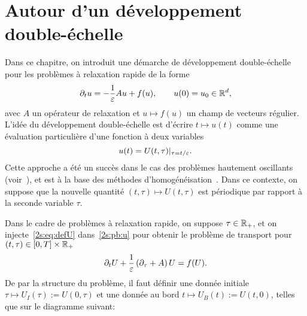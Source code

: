\chapter{Autour d'un développement double-échelle}
\label{chap:two-scale}

Dans ce chapitre, on introduit une démarche de développement double-échelle pour les problèmes à relaxation rapide de la forme
\begin{equation} \label{2s:pb:u}
    \partial_t u = -\frac{1}{\varepsilon}Au + f(u), 
    \qquad
    u(0) = u_0 \in \mathbb{R}^d , 
\end{equation}
avec $A$ un opérateur de relaxation et $u \mapsto f(u)$ un champ de vecteurs régulier. L'idée du développement double-échelle est d'écrire $t \mapsto u(t)$ comme une évaluation particulière d'une fonction à deux variables 
\begin{equation} \label{2s:eq:defU}
    u(t) = U(t,\tau)|_{\tau = t/\varepsilon} .
\end{equation}
Cette approche a été un succès dans le cas des problèmes hautement oscillants (voir~\cite{chartier.2015.uniformly, chartier.2020.derivative}), et est à la base des méthodes d'homogénéisation~\cite{allaire.1992.homogenization}. Dans ce contexte, on suppose que la nouvelle quantité $(t,\tau) \mapsto U(t,\tau)$ est périodique par rapport à la seconde variable $\tau$. 

Dans le cadre de problèmes à relaxation rapide, on suppose $\tau \in \mathbb{R}_+$, et on injecte~\eqref{2s:eq:defU} dans~\eqref{2s:pb:u} pour obtenir le problème de transport pour $(t,\tau) \in [0,T] \times \mathbb{R}_+$ 
\begin{equation} \label{2s:pb:trsp_U}
    \partial_t U + \frac{1}{\varepsilon} \left(\partial_\tau + A \right) U
    = f(U) .
\end{equation}
De par la structure du problème, il faut définir une donnée initiale $\tau \mapsto U_I(\tau) := U(0,\tau)$ et une donnée au bord $t \mapsto U_B(t) := U(t,0)$, telles que sur le diagramme suivant: 

